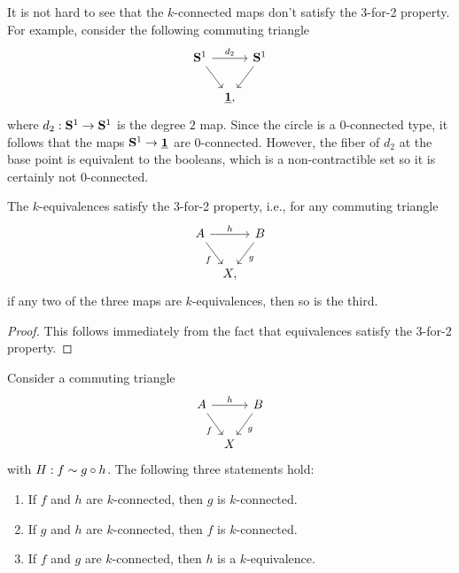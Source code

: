 \begin{rmk}\label{rmk:conn-3-for-2}
  It is not hard to see that the $k$-connected maps don't satisfy the 3-for-2 property. For example, consider the following commuting triangle
  \begin{equation*}
    \begin{tikzcd}[column sep=tiny]
      \sphere{1} \arrow[rr,"d_2"] \arrow[dr] & & \sphere{1} \arrow[dl] \\
      & \unit,
    \end{tikzcd}
  \end{equation*}
  where $d_2:\mathbf{S}^{1}\to\mathbf{S}^{1}$ is the degree $2$ map. Since the circle is a $0$-connected type, it follows that the maps $\mathbf{S}^{1}\to\underline{\mathbf{1}}$ are $0$-connected. However, the fiber of $d_2$ at the base point is equivalent to the booleans, which is a non-contractible set so it is certainly not $0$-connected.
  \end{rmk}

\begin{lem}
  The $k$-equivalences satisfy the 3-for-2 property, i.e., for any commuting triangle
  \begin{equation*}
    \begin{tikzcd}[column sep=tiny]
      A \arrow[rr,"h"] \arrow[dr,swap,"f"] & & B \arrow[dl,"g"] \\
      & X,
    \end{tikzcd}   
  \end{equation*}
  if any two of the three maps are $k$-equivalences, then so is the third.
\end{lem}

\begin{proof}
  This follows immediately from the fact that equivalences satisfy the 3-for-2 property.
\end{proof}

\begin{prp}
  Consider a commuting triangle
  \begin{equation*}
    \begin{tikzcd}[column sep=tiny]
      A \arrow[rr,"h"] \arrow[dr,swap,"f"] & & B \arrow[dl,"g"] \\
      & X
    \end{tikzcd}
  \end{equation*}
  with $H:f\sim g\circ h$. The following three statements hold:
  \begin{enumerate}
  \item If $f$ and $h$ are $k$-connected, then $g$ is $k$-connected.
  \item If $g$ and $h$ are $k$-connected, then $f$ is $k$-connected.
  \item If $f$ and $g$ are $k$-connected, then $h$ is a $k$-equivalence.
  \end{enumerate}
\end{prp}

